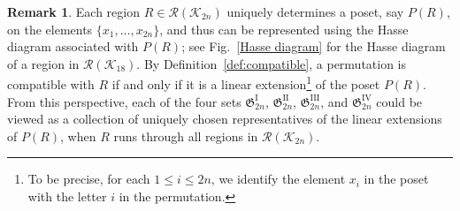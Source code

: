 \documentclass[11pt,reqno]{amsart}
\numberwithin{equation}{section}
\theoremstyle{plain}
\theoremstyle{definition}
\newtheorem{remark}[theorem]{Remark}
\newcommand{\fG}{\mathfrak{G}}
\newcommand{\cK}{\mathcal{K}}
\newcommand{\cR}{\mathcal{R}}
\newcommand{\GI}{\fG^{\mathrm{I}}}
\newcommand{\GII}{\fG^{\mathrm{II}}}
\newcommand{\GIII}{\fG^{\mathrm{III}}}
\newcommand{\GIV}{\fG^{\mathrm{IV}}}
\begin{document}
\begin{remark}
Each region $R\in\cR(\cK_{2n})$ uniquely determines a poset, say $P(R)$, on the elements $\{x_1,\ldots,x_{2n}\}$, and thus can be represented using the Hasse diagram associated with $P(R)$; see Fig.~\ref{Hasse diagram} for the Hasse diagram of a region in $\cR(\cK_{18})$. By Definition~\ref{def:compatible}, a permutation is compatible with $R$ if and only if it is a linear extension\footnote{To be precise, for each $1\le i\le 2n$, we identify the element $x_i$ in the poset with the letter $i$ in the permutation.} of the poset $P(R)$. From this perspective, each of the four sets $\GI_{2n}$, $\GII_{2n}$, $\GIII_{2n}$, and $\GIV_{2n}$ could be viewed as a collection of uniquely chosen representatives of the linear extensions of $P(R)$, when $R$ runs through all regions in $\cR(\cK_{2n})$.
\end{remark}

 
 
\end{document}
